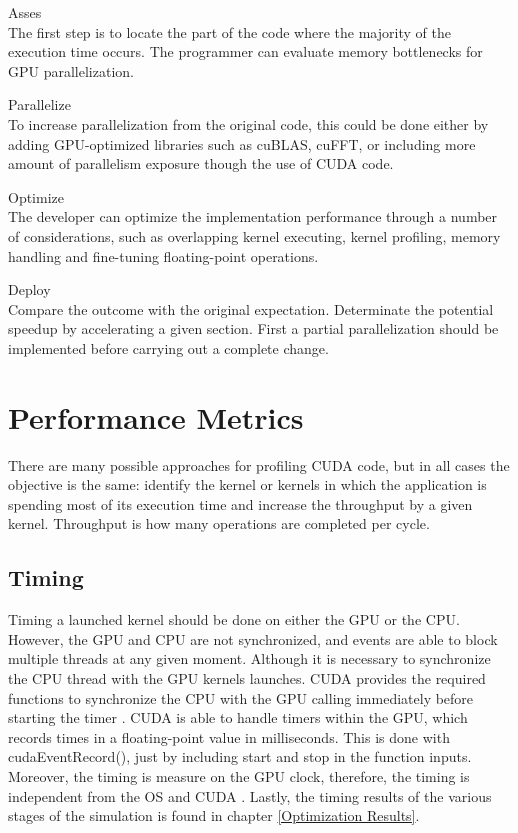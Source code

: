 \begin{description}

 \item{Asses} \hfill \\
 The first step is to locate the part of the code where the majority of the execution time occurs. The programmer can evaluate memory bottlenecks for GPU parallelization.
 \item{Parallelize} \hfill \\
 To increase parallelization from the original code, this could be done either by adding GPU-optimized libraries such as cuBLAS, cuFFT, or including more amount of parallelism exposure though the use of CUDA code.
 \item{Optimize} \hfill \\
The developer can optimize the implementation performance through a number of considerations, such as overlapping kernel executing, kernel profiling, memory handling and fine-tuning floating-point operations.
 \item{Deploy} \hfill \\
 Compare the outcome with the original expectation. Determinate the potential speedup by accelerating a given section. First a partial parallelization should be implemented before carrying out a complete change.
 \end{description}

\section{Performance Metrics}

There are many possible approaches for profiling CUDA code, but in all cases the objective is the same:  identify the kernel or kernels in which the application is spending most of its execution time and increase the throughput by a given kernel. Throughput is how many operations are completed per cycle.

\subsection{Timing}

Timing a launched kernel should be done on either the GPU or the CPU. However, the GPU and CPU are not synchronized, and events are able to block multiple threads at any given moment. Although it is necessary to synchronize the CPU thread with the GPU kernels launches. CUDA provides the required  functions to synchronize the CPU with the GPU calling immediately before starting the timer \cite{practices}. CUDA is able to handle timers within the GPU, which records times in a floating-point value in milliseconds. This is done with {\listf cudaEventRecord()}, just by including {\listf start} and {\listf stop } in the function inputs. Moreover, the timing is measure on the GPU clock, therefore, the timing is independent from the OS and CUDA \cite{cook}. Lastly, the timing results of the various stages of the simulation is found in chapter \ref{Optimization Results}.

